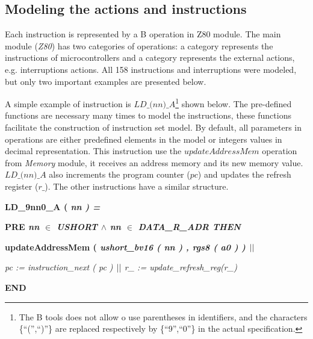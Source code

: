 \documentclass[a4paper]{llncs}
\begin{document}
\subsection{Modeling the actions and instructions}
Each instruction is represented by a B operation in Z80 module. The main
module (\textit{Z80}) has two categories of operations: a category represents the 
instructions of microcontrollers and a category represents the external actions, e.g.
interruptions actions. All 158 instructions and interruptions were modeled, but only
two important examples are presented below.

A simple example of instruction is $\textit{LD\_(nn)\_A}$\footnote{The B tools does not allow o use parentheses in identifiers, and the characters \{``('',``)''\} are
replaced respectively by \{``9'',``0''\} in the actual specification.} shown below. The
pre-defined functions are necessary many times to model the instructions, these
functions facilitate the construction of instruction set model. By default, all
parameters in operations are either predefined elements in the model or
integers values in decimal representation. This instruction use the
$\textit{updateAddressMem}$ operation from \textit{Memory} module, it receives
an address memory and its new memory value. $\textit{LD\_(nn)\_A}$ also increments the program
counter ($\textit{pc}$) and updates the refresh register ($\textit{r\_}$). The other instructions have a similar structure.

\hspace*{0.00in}\bf LD\_9nn0\_A \rm ( \it nn \rm ) \rm =

\hspace*{0.20in}\bf PRE \it nn $\in$ \it USHORT\hspace*{0.15in} $\land$ \hspace*{0.10in}\it nn\hspace*{0.10in} $\in$  \it DATA\_R\_ADR \hspace*{0.10in}\bf THEN

\hspace*{0.20in}\bf updateAddressMem \rm ( \it ushort\_bv16 \rm ( \it nn \rm ) \rm , \it rgs8 \rm ( \it a0 \rm )
\rm )  $\mbox{$\mid\mid$}$

\hspace*{0.20in}\it pc \rm := \it instruction\_next \rm ( \it pc \rm )  $\mbox{$\mid\mid$}$  \it r\_ \rm := \it update\_refresh\_reg\rm (\it r\_\rm )

\hspace*{0.00in}\bf END\rm 
\end{document}
